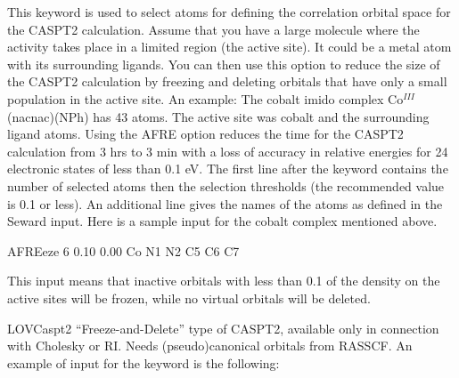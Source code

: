 \begin{keywordlist}
This keyword is used to select atoms for defining the correlation orbital
space for the CASPT2 calculation. Assume that you have a large molecule where
the activity takes place in a limited region (the active site). It could be a
metal atom with its surrounding ligands. You can then use this option to reduce
the size of the CASPT2 calculation by freezing and deleting orbitals that have
only a small population in the active site. An example: The cobalt imido complex
Co$^{III}$(nacnac)(NPh) has 43 atoms. The active site was cobalt and the
surrounding ligand atoms. Using the AFRE option reduces the time for the CASPT2
calculation from 3 hrs to 3 min with a loss of accuracy in relative energies for
24 electronic states of less than 0.1 eV. The first line after the keyword
contains the number of selected atoms then the selection thresholds (the
recommended value is 0.1 or less). An additional line gives the names of the
atoms as defined in the Seward input. Here is a sample input for the cobalt
complex mentioned above.
\begin{inputlisting}
AFREeze
 6 0.10 0.00
 Co N1 N2 C5 C6 C7
\end{inputlisting}
This input means that inactive orbitals with less than 0.1 of the density on
the active sites will be frozen, while no virtual orbitals will be deleted.
\item[LOVCaspt2]
``Freeze-and-Delete'' type of CASPT2, available only in connection with Cholesky or RI.
Needs (pseudo)canonical orbitals from RASSCF. An example of input for the keyword  is the following:
\begin{inputlisting}


\end{inputlisting}
\end{keywordlist}
